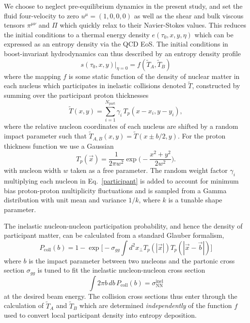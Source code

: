 \documentclass[aps,prc,reprint,amsmath,nofootinbib]{revtex4-1}
\newcommand{\T}{\tilde{T}}
\begin{document}
We choose to neglect pre-equilibrium dynamics in the present study, and set the fluid four-velocity to zero ${u^\mu = (1,0,0,0)}$ as well as the shear and bulk viscous tensors $\pi^{\mu\nu}$ and $\Pi$ which quickly relax to their Navier-Stokes values. This reduces the initial conditions to a thermal energy density $e(\tau_0, x, y, \eta)$ which can be expressed as an entropy density via the QCD EoS. The initial conditions in boost-invariant hydrodynamics can thus described by an entropy density profile
\begin{equation}
    \label{mapping}
    s(\tau_0, x, y)\vert_{\eta=0} = f(\T_A, \T_B)
\end{equation}
where the mapping $f$ is some static function of the density of nuclear matter in each nucleus which participates in inelastic collisions denoted $\T$, constructed by summing over the participant proton thicknesses
\begin{equation}
    \label{participant}
    \T(x, y) = \sum\limits_{i=1}^{N_\text{part}} \gamma_i\, T_p(x - x_i, y - y_i),
\end{equation}
where the relative nucleon coordinates of each nucleus are shifted by a random impact parameter such that ${\T_{A,B}(x, y) = \T(x \pm b/2, y)}$. For the proton thickness function we use a Gaussian
\begin{equation}
    T_p(\vec{x}) = \frac{1}{2\pi w^2} \exp\bigg(\!-\frac{x^2 + y^2}{2 w^2}\bigg). 
\end{equation}    
with nucleon width $w$ taken as a free parameter. The random weight factor $\gamma_i$ multiplying each nucleon in Eq.~\eqref{participant} is added to account for minimum bias proton-proton multiplicity fluctuations and is sampled from a Gamma distribution with unit mean and variance $1/k$, where $k$ is a tunable shape parameter.

The inelastic nucleon-nucleon participation probability, and hence the density of participant matter, can be calculated from a standard Glauber formalism,
\begin{equation}
    P_\text{coll}(b) = 1 - \exp \bigg[ -\sigma_{gg} \int d^2x_\perp T_p(|\vec{x}|) T_p(|\vec{x} - \vec{b}|) \bigg ] 
\end{equation}
where $b$ is the impact parameter between two nucleons and the partonic cross section $\sigma_{gg}$ is tuned to fit the inelastic nucleon-nucleon cross section
\begin{equation}
    \int 2 \pi b\, db\, P_\text{coll}(b) = \sigma_\text{NN}^\text{inel} 
\end{equation}
at the desired beam energy. The collision cross sections thus enter through the calculation of $\T_A$ and $\T_B$ which are determined \emph{independently} of the function $f$ used to convert local participant density into entropy deposition.
\end{document}
